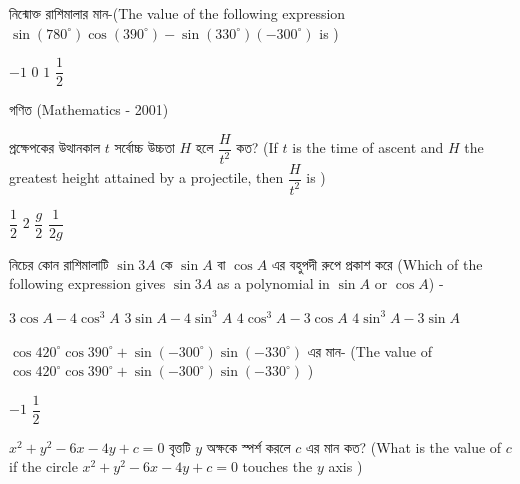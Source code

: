 \documentclass[addpoints]{exam}
\begin{document}
\begin{questions}
\question  নিন্মোক্ত রাশিমালার মান-(The value of the following expression $ \sin (780^{\circ})\cos (390^{\circ})-\sin (330^{\circ}) (-300^{\circ})$ is )  

\begin{oneparchoices}
\choice $ -1 $
\choice $ 0 $
\choice $ 1 $
\choice $ \dfrac{1}{2} $
\end{oneparchoices}

\end{questions}

\begin{LARGE}
\begin{center}
গণিত (Mathematics - 2001)
\end{center}
\end{LARGE}
\begin{questions}

\question  প্রক্ষেপকের উত্থানকাল $ t $ সর্বোচ্চ উচ্চতা $ H $ হলে $ \dfrac{H}{t^{2}} $ কত? (If $ t $ is the time of ascent and $ H $ the greatest height attained by a projectile, then $ \dfrac{H}{t^{2}} $ is )

\begin{oneparchoices}
\choice $ \dfrac{1}{2} $
\choice $ 2 $
\choice $ \dfrac{g}{2} $
\choice $ \dfrac{1}{2g} $
\end{oneparchoices}

\question নিচের কোন রাশিমালাটি $ \sin 3A $ কে $ \sin A $ বা $ \cos A $ এর বহুপদী রুপে প্রকাশ করে (Which of the following expression gives  $ \sin 3A $ as a polynomial in $ \sin A $ or $ \cos A $) -

\begin{oneparchoices}
\choice  $ 3\cos A -4\cos^{3} A $
\choice  $ 3\sin A -4\sin^{3} A $
\choice  $ 4\cos^{3} A -3\cos A $
\choice  $ 4\sin^{3} A -3\sin A $
\end{oneparchoices}

\question  $ \cos 420^{\circ}\cos 390^{\circ} + \sin (-300^{\circ})\sin (-330^{\circ}) $ এর মান- (The value of $ \cos 420^{\circ}\cos 390^{\circ} + \sin (-300^{\circ})\sin (-330^{\circ}) $ ) 

\begin{oneparchoices}
\choice  $ -1 $
\choice  $ \dfrac{1}{2} $
\end{oneparchoices}

\question $ x^{2}+y^{2}-6x-4y+c=0 $ বৃত্তটি $ y $ অক্ষকে স্পর্শ করলে $ c $ এর মান কত? (What is the value of $ c $ if the circle $ x^{2}+y^{2}-6x-4y+c=0 $ touches the $ y $ axis )

\begin{oneparchoices}
\end{oneparchoices}


\end{questions}
\end{document}
